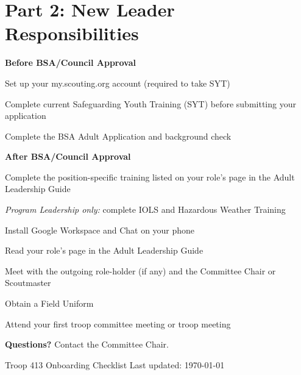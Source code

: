 \documentclass[11pt, letterpaper]{article}
\begin{document}
\section{Part 2: New Leader Responsibilities}

\textbf{\color{scoutgreen} Before BSA/Council Approval}
\begin{checklist}
  \item Set up your my.scouting.org account (required to take SYT)
  \item Complete current Safeguarding Youth Training (SYT) before submitting your application
  \item Complete the BSA Adult Application and background check
\end{checklist}

\textbf{\color{scoutgreen} After BSA/Council Approval}
\begin{checklist}
  \item Complete the position-specific training listed on your role's page in the Adult Leadership Guide
  \item \textit{Program Leadership only:} complete IOLS and Hazardous Weather Training
  \item Install Google Workspace and Chat on your phone
  \item Read your role's page in the Adult Leadership Guide
  \item Meet with the outgoing role-holder (if any) and the Committee Chair or Scoutmaster
  \item Obtain a Field Uniform
  \item Attend your first troop committee meeting or troop meeting
\end{checklist}

\vspace{0.3em}
\noindent\colorbox{lightbg}{%
  \begin{minipage}{\dimexpr\linewidth-2\fboxsep}
    \vspace{0.4em}
    \textbf{\color{scoutgreen} Questions?} \quad Contact the Committee Chair.
    \vspace{0.4em}
  \end{minipage}
}

\vspace{0.5em}
\begin{center}
  \footnotesize\color{gray}
  Troop 413 \textbullet{} Onboarding Checklist \textbullet{} Last updated: \today
\end{center}
\end{document}
